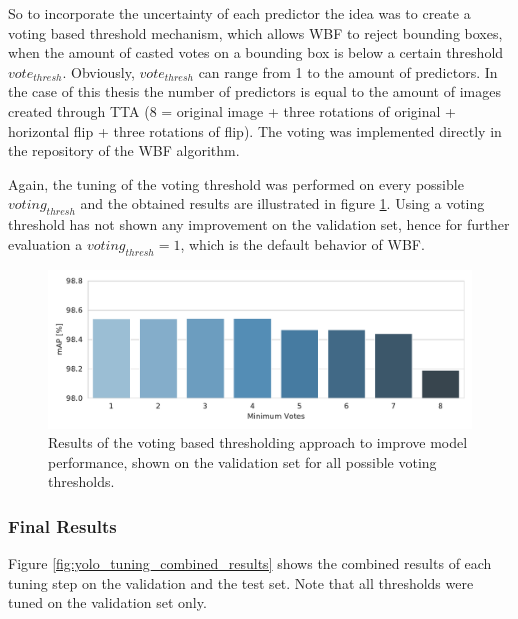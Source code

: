 So to incorporate the uncertainty of each predictor the idea was to create a voting based threshold mechanism, which allows \ac{WBF} to reject bounding boxes, when the amount of casted votes on a bounding box is below a certain threshold $vote_{thresh}$.
Obviously, $vote_{thresh}$ can range from 1 to the amount of predictors.
In the case of this thesis the number of predictors is equal to the amount of images created through \ac{TTA} (8 = original image + three rotations of original + horizontal flip + three rotations of flip).
The voting was implemented directly in the repository of the \ac{WBF} algorithm.

Again, the tuning of the voting threshold was performed on every possible $voting_{thresh}$ and the obtained results are illustrated in figure \ref{fig:wbf_tta_nms_votes}.
Using a voting threshold has not shown any improvement on the validation set, hence for further evaluation a $voting_{thresh} = 1$, which is the default behavior of \ac{WBF}.

\begin{figure}[H]
\begin{center}
    \includegraphics[width=15cm]{imgs/yolo_wbf_tta_votes.pdf}
    \caption{Results of the voting based thresholding approach to improve model performance, shown on the validation set for all possible voting thresholds.}
    \label{fig:wbf_tta_nms_votes}
\end{center}
\end{figure}

\subsubsection{Final Results}

Figure \ref{fig:yolo_tuning_combined_results} shows the combined results of each tuning step on the validation and the test set.
Note that all thresholds were tuned on the validation set only.

